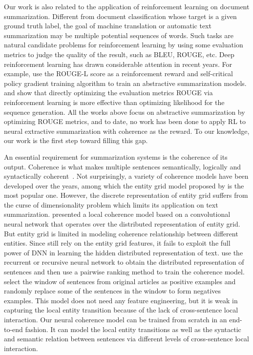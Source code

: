 \documentclass[letterpaper]{article} %
\begin{document}
	Our work is also related to the application of reinforcement learning on document summarization. Different from document classification whose target is a given ground truth label, the goal of machine translation or automatic text summarization may be multiple potential sequences of words. Such tasks are natural candidate problems for reinforcement learning by using some evaluation metrics to judge the quality of the result, such as BLEU, ROUGE, etc. Deep reinforcement learning has drawn considerable attention in recent years. For example, \cite{socher2017_summarization} use the ROUGE-L score as a reinforcement reward and self-critical policy gradient training algorithm to train an abstractive summarization models. \cite{ayana2016} and \cite{sltrnn2016} show that directly optimizing the evaluation metrics ROUGE via reinforcement learning is more effective than optimizing likelihood for the sequence generation. All the works above focus on abstractive summarization by optimizing ROUGE metrics, and to date, no work has been done to apply RL to neural extractive summarization with coherence as the reward. To our knowledge, our work is the first step toward filling this gap.
	
	An essential requirement for summarization systems is the coherence of its output. Coherence is what makes multiple sentences semantically, logically and syntactically coherent~\cite{Yao2017RecentAI}. Not surprisingly, a variety of coherence models have been developed over the years, among which the entity grid model proposed by \cite{entitygrid} is the most popular one. However, the discrete representation of entity grid suffers from the curse of dimensionality problem which limits its application on text summarization. \cite{nlcm} presented a local coherence model based on a convolutional neural network that operates over the distributed representation of entity grid. But entity grid is limited in modeling coherence relationship between different entities. Since \cite{nlcm} still rely on the entity grid features, it fails to exploit the full power of DNN in learning the hidden distributed representation of text. \cite{jiweili2014} use the recurrent or recursive neural network to obtain the distributed representation of sentences and then use a pairwise ranking method to train the coherence model. \cite{jiweili2014} select the window of sentences from original articles as positive examples and randomly replace some of the sentences in the window to form negatives examples. This model does not need any feature engineering, but it is weak in capturing the local entity transition because of the lack of cross-sentence local interaction. Our neural coherence model can be trained from scratch in an end-to-end fashion. It can model the local entity transitions as well as the syntactic and semantic relation between sentences via different levels of cross-sentence local interaction.
\end{document}
